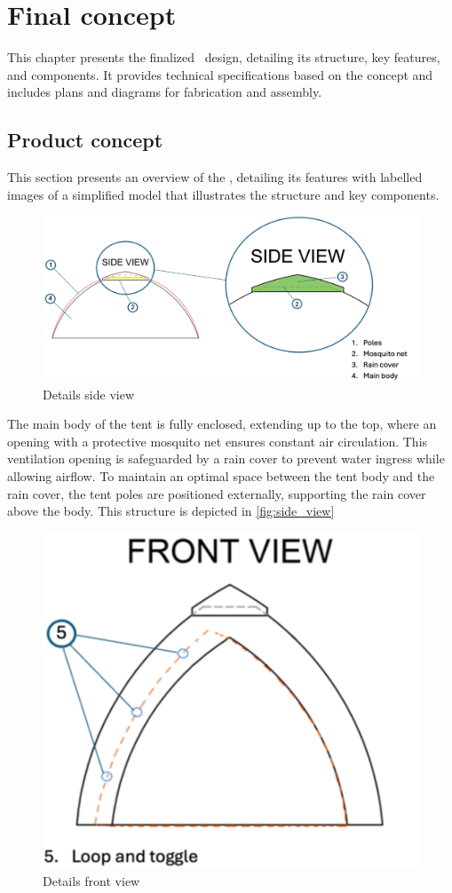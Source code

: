 \documentclass{article}
\begin{document}
\section{Final concept}
\label{sec:final_concept}
This chapter presents the finalized \myc\ design, detailing its structure, key features,
and components. It provides technical specifications based on the concept and includes
plans and diagrams for fabrication and assembly.

\subsection{Product concept}
This section presents an overview of the \myc, detailing its features with labelled
images of a simplified model that illustrates the structure and key components.

\begin{figure}[ht!]
    \centering
    \includegraphics[width=.85\textwidth]{media/side_view.png}
    \caption{Details side view}
    \label{fig:side_view}
\end{figure}

The main body of the tent is fully enclosed, extending up to the top, where an opening with a
protective mosquito net ensures constant air circulation. This ventilation opening is
safeguarded by a rain cover to prevent water ingress while allowing airflow. To maintain an
optimal space between the tent body and the rain cover, the tent poles are positioned
externally, supporting the rain cover above the body. This structure is depicted in \autoref{fig:side_view}

\newpage
\begin{figure}[ht!]
    \centering
    \includegraphics[width=.35\textwidth]{media/front_view.png}
    \caption{Details front view}
    \label{fig:front_view}
\end{figure}
\end{document}
